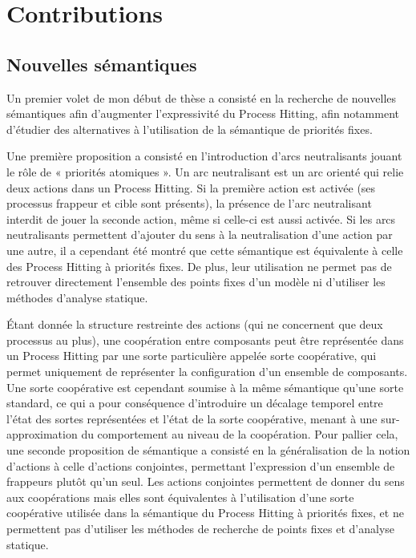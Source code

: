 \chapter{Contributions}


\section{Nouvelles sémantiques}\label{sec:semantiques}
Un premier volet de mon début de thèse a consisté en la recherche de nouvelles sémantiques afin d'augmenter l'expressivité du Process Hitting, afin notamment d'étudier des alternatives à l'utilisation de la sémantique de priorités fixes.

Une première proposition a consisté en l'introduction d'arcs neutralisants jouant le rôle de « priorités atomiques ».
Un arc neutralisant est un arc orienté qui relie deux actions dans un Process Hitting.
Si la première action est activée (\ie ses processus frappeur et cible sont présents), la présence de l'arc neutralisant interdit de jouer la seconde action, même si celle-ci est aussi activée.
Si les arcs neutralisants permettent d'ajouter du sens à la neutralisation d'une action par une autre, il a cependant été montré que cette sémantique est équivalente à celle des Process Hitting à priorités fixes.
De plus, leur utilisation ne permet pas de retrouver directement l'ensemble des points fixes d'un modèle ni d'utiliser les méthodes d'analyse statique.


Étant donnée la structure restreinte des actions (qui ne concernent que deux processus au plus), une coopération entre composants peut être représentée dans un Process Hitting par une sorte particulière appelée sorte coopérative, qui permet uniquement de représenter la configuration d'un ensemble de composants.
Une sorte coopérative est cependant soumise à la même sémantique qu'une sorte standard, ce qui a pour conséquence d'introduire un décalage temporel entre l'état des sortes représentées et l'état de la sorte coopérative, menant à une sur-approximation du comportement au niveau de la coopération.
Pour pallier cela, une seconde proposition de sémantique a consisté en la généralisation de la notion d'actions à celle d'actions conjointes, permettant l'expression d'un ensemble de frappeurs plutôt qu'un seul.
Les actions conjointes permettent de donner du sens aux coopérations mais elles sont équivalentes à l'utilisation d'une sorte coopérative utilisée dans la sémantique du Process Hitting à priorités fixes, et ne permettent pas d'utiliser les méthodes de recherche de points fixes et d'analyse statique.

